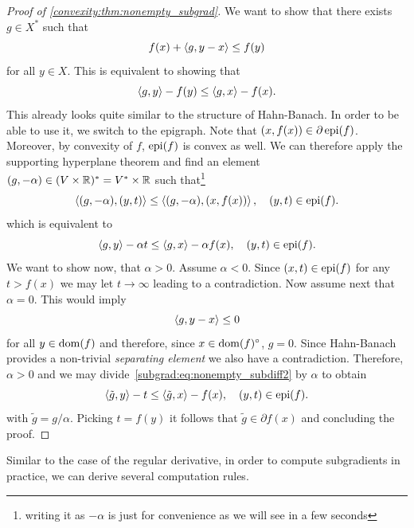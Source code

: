 \begin{proof}[Proof of \cref{convexity:thm:nonempty_subgrad}]
    We want to show that there exists $g\in X^*$ such that
    \begin{equation}
        f(x)+\left\langle g , y-x\right\rangle\leq f(y)
    \end{equation}
    for all $y\in X$. This is equivalent to showing that
    \begin{equation}\label{subgrad:eq:nonempty_subdiff1}
        \left\langle g , y\right\rangle - f(y)\leq \left\langle g , x\right\rangle - f(x).
    \end{equation}
    This already looks quite similar to the structure of Hahn-Banach. In order to be able to use it, we switch to the epigraph. Note that $(x,f(x))\in \partial \operatorname{\mathrm{epi}}(f)$. Moreover, by convexity of $f$, $\operatorname{\mathrm{epi}}(f)$ is convex as well. We can therefore apply the supporting hyperplane theorem and find an element $(g,-\alpha)\in (V\times\mathbb{R})^* = V^*\times\mathbb{R}$ such that\footnote{writing it as $-\alpha$ is just for convenience as we will see in a few seconds}
    \begin{equation}\label{subgrad:eq:nonempty_subdiff2}
        \left\langle(g,-\alpha) , (y,t)\right\rangle\leq \left\langle(g,-\alpha) , (x,f(x))\right\rangle,\quad (y,t)\in \operatorname{\mathrm{epi}}(f).
    \end{equation}
    which is equivalent to
    \begin{equation}
        \left\langle g , y\right\rangle-\alpha t \leq \left\langle g , x\right\rangle - \alpha f(x),\quad (y,t)\in \operatorname{\mathrm{epi}}(f).
    \end{equation}
    We want to show now, that $\alpha>0$. Assume $\alpha<0$. Since $(x,t)\in \operatorname{\mathrm{epi}}(f)$ for any $t>f(x)$ we may let $t\rightarrow \infty$ leading to a contradiction. Now assume next that $\alpha=0$. This would imply 
    \begin{equation}
        \left\langle g , y-x\right\rangle \leq 0
    \end{equation}
    for all $y\in\operatorname{\mathrm{dom}}(f)$ and therefore, since $x\in \operatorname{\mathrm{dom}}(f)^\circ$, $g=0$. Since Hahn-Banach provides a non-trivial \emph{separating element} we also have a contradiction. Therefore, $\alpha>0$ and we may divide~\eqref{subgrad:eq:nonempty_subdiff2} by $\alpha$ to obtain
    \begin{equation}
        \left\langle\tilde{g} , y\right\rangle - t \leq \left\langle\tilde{g} , x\right\rangle - f(x),\quad (y,t)\in \operatorname{\mathrm{epi}}(f).
    \end{equation}
    with $\tilde{g} = g/\alpha$. Picking $t=f(y)$ it follows that $\tilde{g}\in\partial f(x)$ and concluding the proof.
\end{proof}


Similar to the case of the regular derivative, in order to compute subgradients in practice, we can derive several computation rules.


